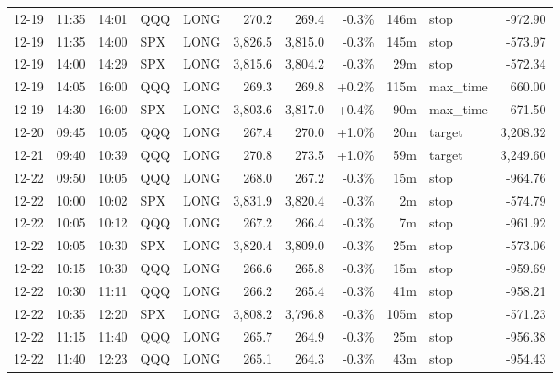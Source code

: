 \documentclass[11pt,a4paper,twoside]{article}
\begin{document}
\begin{center}
\begin{longtable}{>{\color{txtmain}}l l l l l r r r r >{\color{txtmain}}l r}
12-19 & 11:35 & 14:01 & QQQ & LONG & 270.2 & 269.4 & \textcolor{lossred}{-0.3\%} & 146m & stop & \textcolor{lossred}{-972.90} \\
12-19 & 11:35 & 14:00 & SPX & LONG & 3,826.5 & 3,815.0 & \textcolor{lossred}{-0.3\%} & 145m & stop & \textcolor{lossred}{-573.97} \\
12-19 & 14:00 & 14:29 & SPX & LONG & 3,815.6 & 3,804.2 & \textcolor{lossred}{-0.3\%} & 29m & stop & \textcolor{lossred}{-572.34} \\
12-19 & 14:05 & 16:00 & QQQ & LONG & 269.3 & 269.8 & \textcolor{wingreen}{+0.2\%} & 115m & max\_time & \textcolor{wingreen}{660.00} \\
12-19 & 14:30 & 16:00 & SPX & LONG & 3,803.6 & 3,817.0 & \textcolor{wingreen}{+0.4\%} & 90m & max\_time & \textcolor{wingreen}{671.50} \\
12-20 & 09:45 & 10:05 & QQQ & LONG & 267.4 & 270.0 & \textcolor{wingreen}{+1.0\%} & 20m & target & \textcolor{wingreen}{3,208.32} \\
12-21 & 09:40 & 10:39 & QQQ & LONG & 270.8 & 273.5 & \textcolor{wingreen}{+1.0\%} & 59m & target & \textcolor{wingreen}{3,249.60} \\
12-22 & 09:50 & 10:05 & QQQ & LONG & 268.0 & 267.2 & \textcolor{lossred}{-0.3\%} & 15m & stop & \textcolor{lossred}{-964.76} \\
12-22 & 10:00 & 10:02 & SPX & LONG & 3,831.9 & 3,820.4 & \textcolor{lossred}{-0.3\%} & 2m & stop & \textcolor{lossred}{-574.79} \\
12-22 & 10:05 & 10:12 & QQQ & LONG & 267.2 & 266.4 & \textcolor{lossred}{-0.3\%} & 7m & stop & \textcolor{lossred}{-961.92} \\
12-22 & 10:05 & 10:30 & SPX & LONG & 3,820.4 & 3,809.0 & \textcolor{lossred}{-0.3\%} & 25m & stop & \textcolor{lossred}{-573.06} \\
12-22 & 10:15 & 10:30 & QQQ & LONG & 266.6 & 265.8 & \textcolor{lossred}{-0.3\%} & 15m & stop & \textcolor{lossred}{-959.69} \\
12-22 & 10:30 & 11:11 & QQQ & LONG & 266.2 & 265.4 & \textcolor{lossred}{-0.3\%} & 41m & stop & \textcolor{lossred}{-958.21} \\
12-22 & 10:35 & 12:20 & SPX & LONG & 3,808.2 & 3,796.8 & \textcolor{lossred}{-0.3\%} & 105m & stop & \textcolor{lossred}{-571.23} \\
12-22 & 11:15 & 11:40 & QQQ & LONG & 265.7 & 264.9 & \textcolor{lossred}{-0.3\%} & 25m & stop & \textcolor{lossred}{-956.38} \\
12-22 & 11:40 & 12:23 & QQQ & LONG & 265.1 & 264.3 & \textcolor{lossred}{-0.3\%} & 43m & stop & \textcolor{lossred}{-954.43} \\

\end{longtable}
\end{center}
\end{document}
